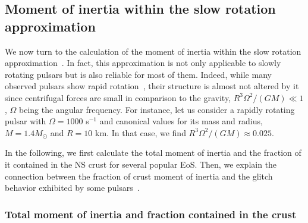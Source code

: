 \subsection{Moment of inertia within the slow rotation
approximation}\label{subsec:moi}

We now turn to the calculation of the moment of inertia within the slow 
rotation approximation~\cite{Hartle1967}. In 
fact, this approximation is not only applicable to slowly rotating pulsars but 
is also reliable for most of them. Indeed, while many observed pulsars show  
rapid rotation~\cite{Stovall2013}, their structure is almost not altered by it 
since centrifugal forces are small in comparison to the gravity, 
$R^3\Omega^2/(GM) \ll 1$, $\Omega$ being the angular frequency. For instance, 
let us consider a rapidly rotating pulsar with $\Omega = 1000$ s$^{-1}$ and 
canonical values for its mass and radius, $M=1.4M_\odot$ and $R=10$ km. In that 
case, we find $R^3\Omega^2/(GM) \approx 0.025$.

In the following, we first calculate the total moment of inertia and the 
fraction of it contained in the NS crust for several popular EoS. Then, we 
explain the connection between the fraction of crust moment of inertia 
and the glitch behavior exhibited by some pulsars~\cite{Espinoza2011}.

\subsubsection{Total moment of inertia and fraction contained in the crust}


